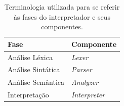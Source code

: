 \begin{table}[h]
	\centering
	\caption{Terminologia utilizada para se referir às fases do interpretador e seus componentes.}
	{
		\begin{tabular}{ll}
			\hline
			\textbf{Fase}     & \textbf{Componente}  \\ \hline
			Análise Léxica    & \textit{Lexer}       \\
			Análise Sintática & \textit{Parser}      \\
			Análise Semântica & \textit{Analyzer}    \\
			Interpretação     & \textit{Interpreter} \\ \hline
		\end{tabular}
	}
	\label{tab:terminologia_fases}
\end{table}
